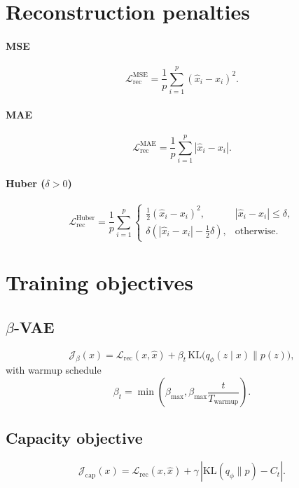 \documentclass[11pt]{article}
\begin{document}
\section{Reconstruction penalties}
\paragraph{MSE}
\begin{equation}
\mathcal L_{\mathrm{rec}}^{\mathrm{MSE}}=\frac1p\sum_{i=1}^p(\hat x_i-x_i)^2.
\end{equation}
\paragraph{MAE}
\begin{equation}
\mathcal L_{\mathrm{rec}}^{\mathrm{MAE}}=\frac1p\sum_{i=1}^p|\hat x_i-x_i|.
\end{equation}
\paragraph{Huber ($\delta>0$)}
\begin{equation}
\mathcal L_{\mathrm{rec}}^{\mathrm{Huber}}
=\frac1p\sum_{i=1}^p
\begin{cases}
\tfrac12(\hat x_i-x_i)^2,& |\hat x_i-x_i|\le\delta,\\
\delta\left(|\hat x_i-x_i|-\tfrac12\delta\right),& \text{otherwise}.
\end{cases}
\end{equation}

\section{Training objectives}
\subsection*{$\beta$-VAE}
\begin{equation}
\mathcal J_\beta(x)
=\mathcal L_{\mathrm{rec}}(x,\hat x)
+\beta_t\,\mathrm{KL}\big(q_\phi(z\mid x)\|p(z)\big),
\end{equation}
with warmup schedule
\begin{equation}
\beta_t=\min\!\left(\beta_{\max},\beta_{\max}\frac{t}{T_{\mathrm{warmup}}}\right).
\end{equation}

\subsection*{Capacity objective}
\begin{equation}
\mathcal J_{\mathrm{cap}}(x)
=\mathcal L_{\mathrm{rec}}(x,\hat x)
+\gamma\,\left|\mathrm{KL}(q_\phi\|p)-C_t\right|.
\end{equation}
\end{document}
